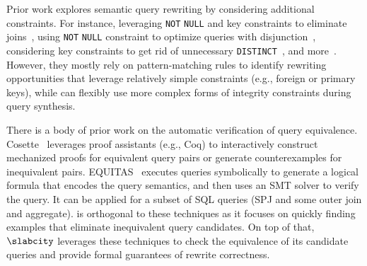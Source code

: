  Prior work  explores semantic query rewriting by considering additional constraints. For instance, leveraging \texttt{NOT} \texttt{NULL} and key constraints to eliminate joins~\cite{join-elimination}, using \texttt{NOT} \texttt{NULL} constraint to optimize queries with disjunction~\cite{blog-disjunct}, considering key constraints to get rid of unnecessary \texttt{DISTINCT}~\cite{habimana2015query}, and more~\cite{presto-qo,db2-qo}. However, they mostly rely on pattern-matching rules to identify rewriting opportunities that leverage relatively simple constraints (e.g., foreign or primary keys), while \slabcity can flexibly use more complex forms of integrity constraints during query synthesis. 


There is a body of prior work on the automatic verification of query equivalence. Cosette~\cite{chu2017cosette} leverages proof assistants (e.g., Coq)
to interactively construct mechanized proofs for equivalent query pairs or generate counterexamples for inequivalent pairs. EQUITAS~\cite{zhou2019automated,zhou2022spes}  executes queries symbolically to generate a logical formula that encodes the query semantics, and then uses an SMT solver to verify the query. It can be applied for a subset of SQL queries (SPJ and some outer join and aggregate). \slabcity is orthogonal to these techniques as it focuses on quickly finding examples that eliminate inequivalent query candidates. 
On top of that, $\slabcity$ leverages these techniques to check the equivalence of its candidate queries and provide formal guarantees of rewrite correctness. 

